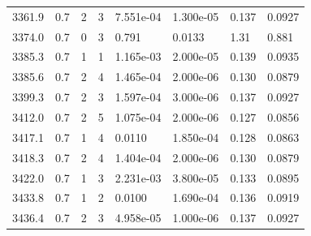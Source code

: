 \documentclass[preview]{standalone}
\begin{document}
{{{{{{{{{{{{{\begin{tabular}{L{1.2cm}C{1.2cm} C{0.3cm}C{0.5cm} C{1.4cm}C{1.4cm} C{1.4cm}C{1.4cm}}
  3361.9  &   0.7  & 2     &  3 &  7.551e-04  & 1.300e-05  & 0.137 &  0.0927   \\ 
  3374.0  &   0.7  & 0     &  3 &  0.791  & 0.0133  & 1.31 &  0.881   \\ 
  3385.3  &   0.7  & 1     &  1 &  1.165e-03  & 2.000e-05  & 0.139 &  0.0935   \\ 
  3385.6  &   0.7  & 2     &  4 &  1.465e-04  & 2.000e-06  & 0.130 &  0.0879   \\ 
  3399.3  &   0.7  & 2     &  3 &  1.597e-04  & 3.000e-06  & 0.137 &  0.0927   \\ 
  3412.0  &   0.7  & 2     &  5 &  1.075e-04  & 2.000e-06  & 0.127 &  0.0856   \\ 
  3417.1  &   0.7  & 1     &  4 &  0.0110  & 1.850e-04  & 0.128 &  0.0863   \\ 
  3418.3  &   0.7  & 2     &  4 &  1.404e-04  & 2.000e-06  & 0.130 &  0.0879   \\ 
  3422.0  &   0.7  & 1     &  3 &  2.231e-03  & 3.800e-05  & 0.133 &  0.0895   \\ 
  3433.8  &   0.7  & 1     &  2 &  0.0100  & 1.690e-04  & 0.136 &  0.0919   \\ 
  3436.4  &   0.7  & 2     &  3 &  4.958e-05  & 1.000e-06  & 0.137 &  0.0927   \\ 
\hline 
\end{tabular} 

}}}}}}}}}}}}}
\end{document}
